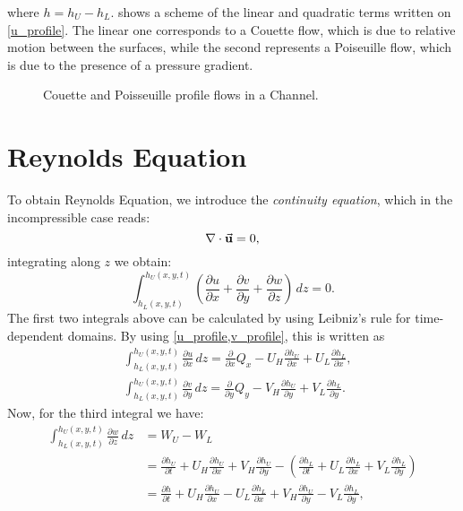 where $h=h_U-h_L$.  shows a scheme of the linear and quadratic terms written on \eqref{u_profile}. The linear one corresponds to a Couette flow, which is due to relative motion between the surfaces, while the second represents a Poiseuille flow, which is due to the presence of a pressure gradient.
\begin{figure}[ht!]
 \centering 
 \def\svgwidth{\textwidth}	
\caption[Channel Problem scheme]{Couette and Poisseuille profile flows in a Channel.}\label{fig:vel_prof_poi_cou}
\end{figure}

\section{Reynolds Equation}\label{sec:reynolds_equation}
To obtain Reynolds Equation, we introduce the \emph{continuity equation}, which in the incompressible case reads:
\begin{equation}
\nabla \cdot \veca{u}=0,\label{eq:continuity}
\end{equation}
integrating along $z$ we obtain:
\begin{equation}
\int_{h_L(x,y,t)}^{h_U(x,y,t)}\left(\frac{\partial u}{\partial x}+\frac{\partial v}{\partial y}+\frac{\partial w}{\partial z}\right)\,dz=0.\label{eq:continuity2}
\end{equation}
The first two integrals above can be calculated by using Leibniz's rule for time-dependent domains. By using \eqref{u_profile,v_profile}, this is written as
\begin{align}
&\int_{h_L(x,y,t)}^{h_U(x,y,t)}\frac{\partial u}{\partial x}\,dz=\frac{\partial}{\partial x}Q_x-U_H\frac{\partial h_U} {\partial x}+U_L\frac{\partial h_L} {\partial x},\label{eq:u_term}\\
&\int_{h_L(x,y,t)}^{h_U(x,y,t)}\frac{\partial v}{\partial y}\,dz=\frac{\partial}{\partial y}Q_y-V_H\frac{\partial h_U} {\partial y}+V_L\frac{\partial h_L} {\partial y}.\label{eq:v_term}
\end{align}
Now, for the third integral we have:
\begin{align}
\int_{h_L(x,y,t)}^{h_U(x,y,t)}\frac{\partial w}{\partial z}\,dz&=W_U-W_L\nonumber\\
&=\frac{\partial h_U}{\partial t}+U_H\frac{\partial h_U}{\partial x}+V_H\frac{\partial h_U}{\partial y}-\left(\frac{\partial h_L}{\partial t}+U_L\frac{\partial h_L}{\partial x}+V_L\frac{\partial h_L}{\partial y}\right)\nonumber\\
&=\frac{\partial h}{\partial t}+U_H\frac{\partial h_U}{\partial x}-U_L\frac{\partial h_L}{\partial x}+V_H\frac{\partial h_U}{\partial y}-V_L\frac{\partial h_L}{\partial y},\label{eq:w_term}
\end{align}
